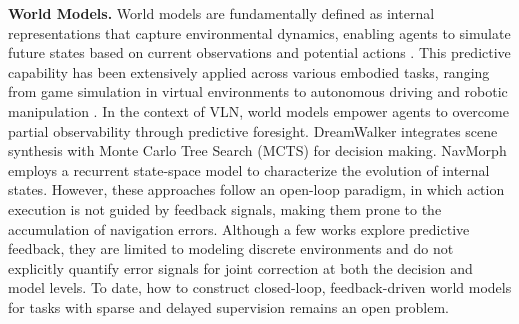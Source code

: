 \documentclass{article}
\theoremstyle{plain}
\theoremstyle{definition}
\theoremstyle{remark}
\begin{document}
\noindent\textbf{World Models.} World models are fundamentally defined as internal representations that capture environmental dynamics, enabling agents to simulate future states based on current observations and potential actions \citep{ha2018world,hafner2025dreamerv3}. This predictive capability has been extensively applied across various embodied tasks, ranging from game simulation in virtual environments \citep{valevski2024game} to autonomous driving \citep{nvidia2025cosmosdrivedreams,russell2025gaia} and robotic manipulation \citep{chi2025wow,chi2024evaembodiedworldmodel}. In the context of VLN, world models empower agents to overcome partial observability through predictive foresight. 
DreamWalker \citep{wang2023dreamwalker} integrates scene synthesis with Monte Carlo Tree Search (MCTS) for decision making. NavMorph \citep{Yao2025navmorph} employs a recurrent state-space model to characterize the evolution of internal states. However, these approaches follow an open-loop paradigm, in which action execution is not guided by feedback signals, making them prone to the accumulation of navigation errors. Although a few works \citep{huang2025unemo} explore predictive feedback, they are limited to modeling discrete environments and do not explicitly quantify error signals for joint correction at both the decision and model levels. To date, how to construct closed-loop, feedback-driven world models for tasks with sparse and delayed supervision remains an open problem.
\end{document}
